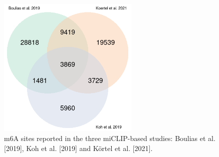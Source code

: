\documentclass[times, 11pt, a4paper]{article}
\begin{document}
\begin{figure}[h!]
	\includegraphics[width = 0.6\textwidth]{img/venn_diagramm.png}
	\caption{m6A sites reported in the three miCLIP-based studies: Boulias et al. [2019], Koh et al. [2019] and Körtel et al. [2021].}
	\label{fig:miclip_sites}
\end{figure}
\newpage
\end{document}

